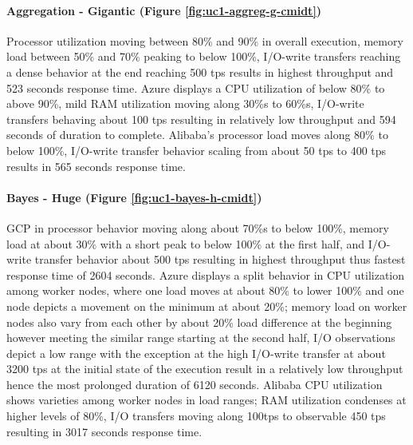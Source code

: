 \documentclass[review]{elsarticle}
\begin{document}
\paragraph{Aggregation - Gigantic (Figure \ref{fig:uc1-aggreg-g-cmidt})}Processor utilization moving between 80\% and 90\% in overall execution, memory load between 50\% and 70\% peaking to below 100\%, I/O-write transfers reaching a dense behavior at the end reaching 500 tps results in highest throughput and 523 seconds response time. Azure displays a CPU utilization of below 80\% to above 90\%, mild RAM utilization moving along 30\%s to 60\%s, I/O-write transfers behaving about 100 tps resulting in relatively low throughput and 594 seconds of duration to complete. Alibaba's processor load moves along 80\% to below 100\%, I/O-write transfer behavior scaling from about 50 tps to 400 tps results in 565 seconds response time.

\paragraph{Bayes - Huge (Figure \ref{fig:uc1-bayes-h-cmidt})}GCP in processor behavior moving along about 70\%s to below 100\%, memory load at about 30\% with a short peak to below 100\% at the first half, and I/O-write transfer behavior about 500 tps resulting in highest throughput thus fastest response time of 2604 seconds. Azure displays a split behavior in CPU utilization among worker nodes, where one load moves at about 80\% to lower 100\% and one node depicts a movement on the minimum at about 20\%; memory load on worker nodes also vary from each other by about 20\% load difference at the beginning however meeting the similar range starting at the second half, I/O observations depict a low range with the exception at the high I/O-write transfer at about 3200 tps at the initial state of the execution result in a relatively low throughput hence the most prolonged duration of 6120 seconds. Alibaba CPU utilization shows varieties among worker nodes in load ranges; RAM utilization condenses at higher levels of 80\%, I/O transfers moving along 100tps to observable 450 tps resulting in 3017 seconds response time.
\end{document}
